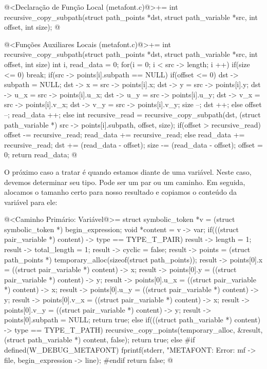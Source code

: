 {\iniciocodigo
@<Declaração de Função Local (metafont.c)@>+=
int recursive_copy_subpath(struct path_points *dst, struct path_variable *src,
                           int offset, int size);
@
\fimcodigo


\iniciocodigo
@<Funções Auxiliares Locais (metafont.c)@>+=
int recursive_copy_subpath(struct path_points *dst, struct path_variable *src,
                           int offset, int size){
  int i, read_data = 0;
  for(i = 0; i < src -> length; i ++){
    if(size <= 0)
      break;
    if(src -> points[i].subpath == NULL){
      if(offset <= 0){
        dst -> subpath = NULL;
        dst -> x = src -> points[i].x;
        dst -> y = src -> points[i].y;
        dst -> u_x = src -> points[i].u_x;
        dst -> u_y = src -> points[i].u_y;
        dst -> v_x = src -> points[i].v_x;
        dst -> v_y = src -> points[i].v_y;
        size --;
        dst ++;
      }
      else
        offset --;
      read_data ++;
    }
    else{
      int recursive_read = recursive_copy_subpath(dst, (struct path_variable *)
                                                       src -> points[i].subpath,
                                                  offset, size);
      if(offset > recursive_read){
        offset -= recursive_read;
        read_data += recursive_read;
      }
      else{
        read_data += recursive_read;
        dst += (read_data - offset);
        size -= (read_data - offset);
        offset = 0;
      }
    }
  }
  return read_data;
}
@
\fimcodigo

O próximo caso a tratar é quando estamos diante de uma variável. Neste
caso, devemos determinar seu tipo. Pode ser um par ou um caminho. Em
seguida, alocamos o tamanho certo para nosso resultado e copiamos o
conteúdo da variável para ele:

\iniciocodigo
@<Caminho Primário: Variável@>=
{
  struct symbolic_token *v = (struct symbolic_token *) begin_expression;
  void *content = v -> var;
  if(((struct pair_variable *) content) -> type == TYPE_T_PAIR){
    result -> length = 1;
    result -> total_length = 1;
    result -> cyclic = false;
    result -> points = (struct path_points *)
                         temporary_alloc(sizeof(struct path_points));
    result -> points[0].x = ((struct pair_variable *) content) -> x;
    result -> points[0].y = ((struct pair_variable *) content) -> y;
    result -> points[0].u_x = ((struct pair_variable *) content) -> x;
    result -> points[0].u_y = ((struct pair_variable *) content) -> y;
    result -> points[0].v_x = ((struct pair_variable *) content) -> x;
    result -> points[0].v_y = ((struct pair_variable *) content) -> y;
    result -> points[0].subpath = NULL;
    return true;
  }
  else if(((struct path_variable *) content) -> type == TYPE_T_PATH){
    recursive_copy_points(temporary_alloc, &result,
                          (struct path_variable *) content, false);
    return true;
  }
  else{
#if defined(W_DEBUG_METAFONT)
    fprintf(stderr, "METAFONT: Error: %
            mf -> file, begin_expression -> line);
#endif
    return false;
  }
}
@
\fimcodigo

}
